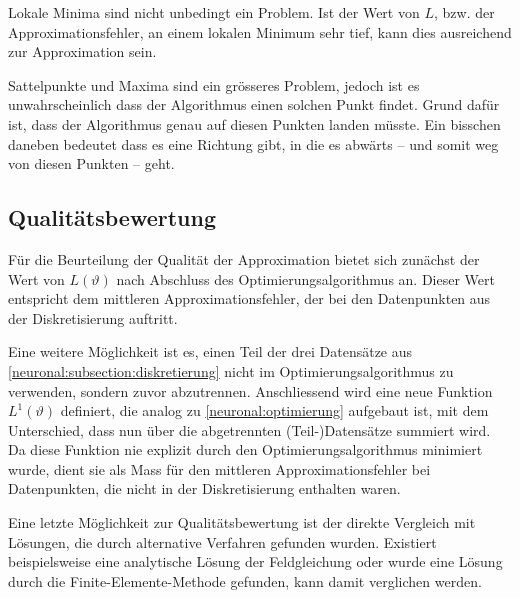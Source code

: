 Lokale Minima sind nicht unbedingt ein Problem. 
Ist der Wert von $L$, bzw. der Approximationsfehler, an einem lokalen Minimum sehr tief, kann dies ausreichend zur Approximation sein.

Sattelpunkte und Maxima sind ein grösseres Problem, jedoch ist es unwahrscheinlich dass der Algorithmus einen solchen Punkt findet.
Grund dafür ist, dass der Algorithmus genau auf diesen Punkten landen müsste.
Ein bisschen daneben bedeutet dass es eine Richtung gibt, in die es abwärts -- und somit weg von diesen Punkten -- geht.

\subsection{Qualitätsbewertung}\label{neuronal:subsection:qualitätsbewertung}
Für die Beurteilung der Qualität der Approximation bietet sich zunächst der Wert von \( L(\vartheta) \) nach Abschluss des Optimierungsalgorithmus an.
Dieser Wert entspricht dem mittleren Approximationsfehler, der bei den Datenpunkten aus der Diskretisierung auftritt.

Eine weitere Möglichkeit ist es, einen Teil der drei Datensätze aus \ref{neuronal:subsection:diskretierung} nicht im Optimierungsalgorithmus zu verwenden, sondern zuvor abzutrennen.
Anschliessend wird eine neue Funktion \( L^1(\vartheta) \) definiert, die analog zu \eqref{neuronal:optimierung} aufgebaut ist, mit dem Unterschied, dass nun über die abgetrennten (Teil-)Datensätze summiert wird.
Da diese Funktion nie explizit durch den Optimierungsalgorithmus minimiert wurde, dient sie als Mass für den mittleren Approximationsfehler bei Datenpunkten, die nicht in der Diskretisierung enthalten waren.

Eine letzte Möglichkeit zur Qualitätsbewertung ist der direkte Vergleich mit Lösungen, die durch alternative Verfahren gefunden wurden.
Existiert beispielsweise eine analytische Lösung der Feldgleichung oder wurde eine Lösung durch die Finite-Elemente-Methode gefunden, kann damit verglichen werden.
